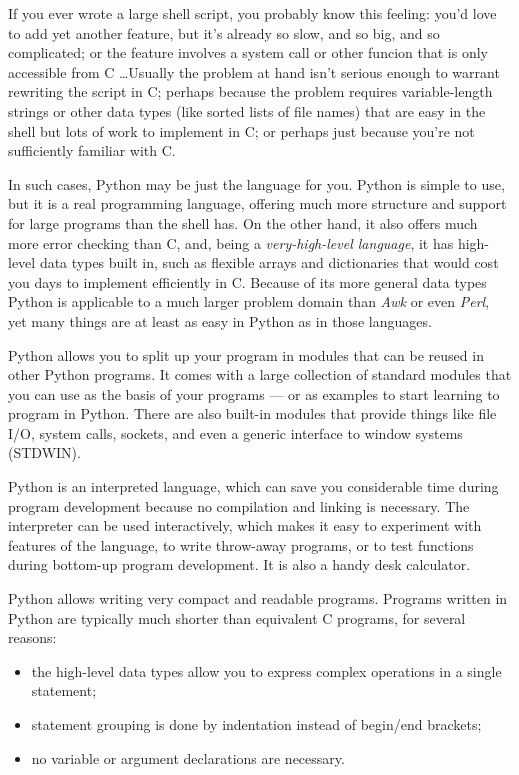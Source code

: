 If you ever wrote a large shell script, you probably know this
feeling: you'd love to add yet another feature, but it's already so
slow, and so big, and so complicated; or the feature involves a system
call or other funcion that is only accessible from C \ldots  Usually
the problem at hand isn't serious enough to warrant rewriting the
script in C; perhaps because the problem requires variable-length
strings or other data types (like sorted lists of file names) that are
easy in the shell but lots of work to implement in C; or perhaps just
because you're not sufficiently familiar with C.

In such cases, Python may be just the language for you.  Python is
simple to use, but it is a real programming language, offering much
more structure and support for large programs than the shell has.  On
the other hand, it also offers much more error checking than C, and,
being a {\em very-high-level language}, it has high-level data types
built in, such as flexible arrays and dictionaries that would cost you
days to implement efficiently in C.  Because of its more general data
types Python is applicable to a much larger problem domain than {\em
Awk} or even {\em Perl}, yet many things are at least as easy in
Python as in those languages.

Python allows you to split up your program in modules that can be
reused in other Python programs.  It comes with a large collection of
standard modules that you can use as the basis of your programs --- or
as examples to start learning to program in Python.  There are also
built-in modules that provide things like file I/O, system calls,
sockets, and even a generic interface to window systems (STDWIN).

Python is an interpreted language, which can save you considerable time
during program development because no compilation and linking is
necessary.  The interpreter can be used interactively, which makes it
easy to experiment with features of the language, to write throw-away
programs, or to test functions during bottom-up program development.
It is also a handy desk calculator.

Python allows writing very compact and readable programs.  Programs
written in Python are typically much shorter than equivalent C
programs, for several reasons:
\begin{itemize}
\item
the high-level data types allow you to express complex operations in a
single statement;
\item
statement grouping is done by indentation instead of begin/end
brackets;
\item
no variable or argument declarations are necessary.
\end{itemize}


